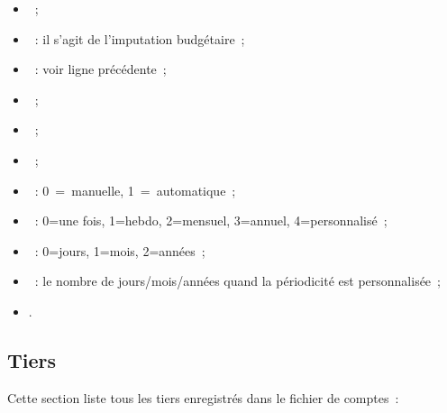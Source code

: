 \begin{itemize}
\begin{itemize}
\item {}~;

\item {}~: il s'agit de l'imputation budgétaire~;

\item {}~: voir ligne précédente~;

\item {}~;

\item {}~;

\item {}~;

\item {}~: 0~=~manuelle, 1~=~automatique~;

\item {}~: 0=une fois, 1=hebdo, 2=mensuel, 3=annuel, 
4=personnalisé~;

\item {}~: 0=jours, 1=mois, 2=années~;

\item {}~: le nombre de jours/mois/années quand 
la périodicité est personnalisée~;

\item {}.

\end{itemize}

\end{itemize}

\subsection{Tiers}

Cette section liste tous les tiers enregistrés dans le fichier de comptes~:

